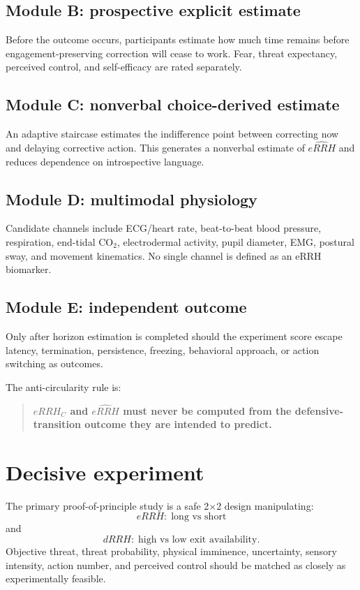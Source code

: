 \documentclass[9pt,twocolumn]{article}
\begin{document}
\subsection{Module B: prospective explicit estimate}
Before the outcome occurs, participants estimate how much time remains before engagement-preserving correction will cease to work. Fear, threat expectancy, perceived control, and self-efficacy are rated separately.

\subsection{Module C: nonverbal choice-derived estimate}
An adaptive staircase estimates the indifference point between correcting now and delaying corrective action. This generates a nonverbal estimate of $\widehat{eRRH}$ and reduces dependence on introspective language.

\subsection{Module D: multimodal physiology}
Candidate channels include ECG/heart rate, beat-to-beat blood pressure, respiration, end-tidal CO$_2$, electrodermal activity, pupil diameter, EMG, postural sway, and movement kinematics. No single channel is defined as an eRRH biomarker.

\subsection{Module E: independent outcome}
Only after horizon estimation is completed should the experiment score escape latency, termination, persistence, freezing, behavioral approach, or action switching as outcomes.

The anti-circularity rule is:
\begin{quote}
\textbf{$eRRH_C$ and $\widehat{eRRH}$ must never be computed from the defensive-transition outcome they are intended to predict.}
\end{quote}

\section{Decisive experiment}
The primary proof-of-principle study is a safe 2$\times$2 design manipulating:
\[
 eRRH:\;\text{long vs short}
\]
and
\[
 dRRH:\;\text{high vs low exit availability}.
\]
Objective threat, threat probability, physical imminence, uncertainty, sensory intensity, action number, and perceived control should be matched as closely as experimentally feasible.
\end{document}
